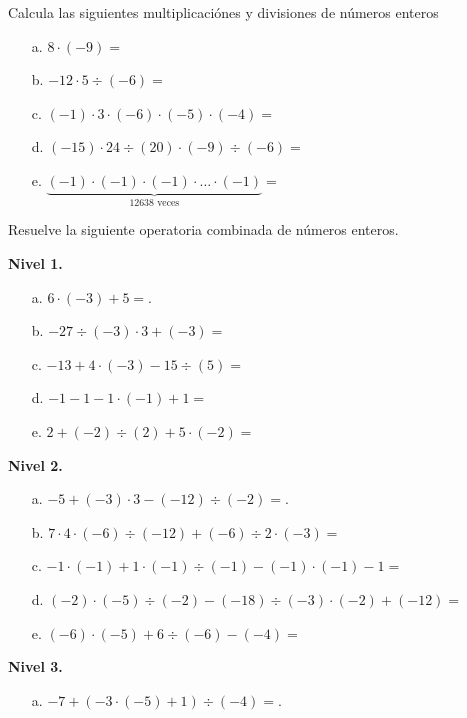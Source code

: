 \documentclass[spanish,letterpaper, 11pt, addpoints, answers]{exam}
\begin{document}
\begin{questions}

\question Calcula las siguientes multiplicaciónes y divisiones de números enteros

\begin{itemize}
\item[a. ]$8\cdot (-9) =$
\item[b. ]$-12\cdot 5\div (-6) =$
\item[c. ]$(-1)\cdot 3\cdot (-6)\cdot (-5)\cdot (-4)=$
\item[d. ]$(-15)\cdot 24\div(20)\cdot (-9)\div (-6) =$
\item[e. ]$\underbrace{(-1)\cdot (-1)\cdot (-1)\cdot \ldots \cdot (-1)}_{\text{12638 veces}} =$
\end{itemize}

\question Resuelve la siguiente operatoria combinada de números enteros.

\textbf{Nivel 1.}
\begin{itemize}
\item[a.] $6\cdot(-3)+5=$.

\item[b.] $-27\div (-3)\cdot 3+(-3)=$

\item[c.] $-13+4\cdot (-3)-15\div (5)=$

\item[d.] $-1-1-1\cdot(-1)+1=$

\item[e.] $2+(-2)\div (2)+5\cdot (-2)=$
\end{itemize}

\textbf{Nivel 2.}
\begin{itemize}
\item[a.] $-5+(-3)\cdot 3-(-12)\div (-2)=$.

\item[b.] $7\cdot 4\cdot (-6)\div (-12)+(-6)\div 2\cdot (-3)=$

\item[c.] $-1\cdot (-1)+1\cdot (-1)\div (-1)-(-1)\cdot (-1)-1=$

\item[d.] $(-2)\cdot (-5)\div (-2)-(-18)\div(-3)\cdot (-2)+(-12)=$

\item[e.] $(-6)\cdot(-5)+6\div(-6)-(-4)=$

\end{itemize}

\textbf{Nivel 3.}
\begin{itemize}
\item[a.] $-7+(-3\cdot (-5)+1)\div(-4)=$.


\end{itemize}
\end{questions}
\end{document}
